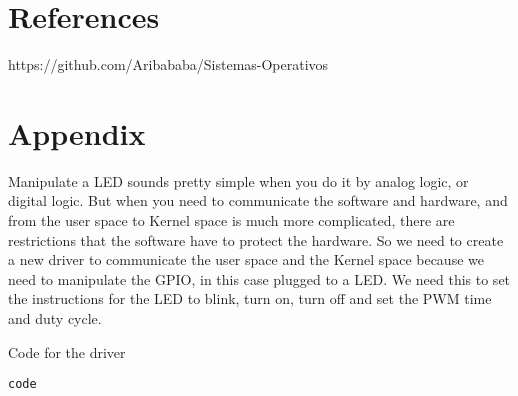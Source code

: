 \documentclass[a4paper]{article}
\begin{document}
\section{References}

\begin{thebibliography}{} 
    
    https://github.com/Aribababa/Sistemas-Operativos
        

\end{thebibliography}


\newpage 
    \section{Appendix} 
 
Manipulate a LED sounds pretty simple when you do it by analog logic, or digital logic. But when you need to communicate the software and hardware, and from the user space to Kernel space is much more complicated, there are restrictions that the software have to protect the hardware. So we need to create a new driver to communicate the user space and the Kernel space because we need to manipulate the GPIO, in this case plugged to a LED. We need this to set the instructions for the LED to blink, turn on, turn off and set the PWM time and duty cycle.

Code for the driver
\begin{lstlisting}
code
\end{lstlisting}
\end{document}
